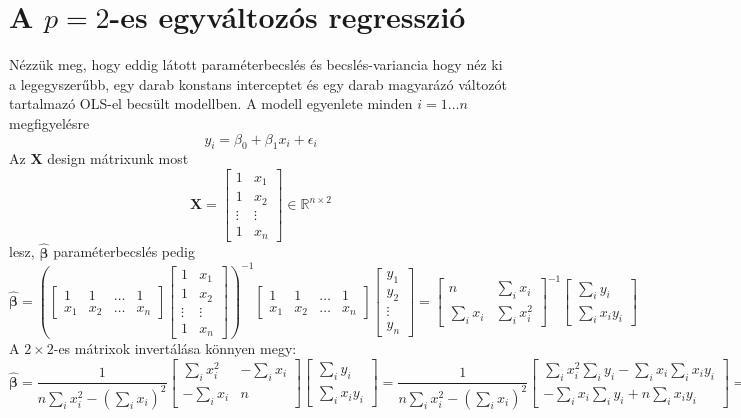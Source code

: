\documentclass[14p]{report}
\def\pmb{\boldsymbol}
\def\ebeta{\hat{\pmb{\beta}}}
\def\e{\epsilon}
\newcounter{x}
\newcounter{y}
\newcounter{z}
\begin{document}
	\section{A $p=2$-es egyváltozós regresszió}
	Nézzük meg, hogy eddig látott paraméterbecslés és becslés-variancia hogy néz ki a legegyszerűbb, egy darab konstans interceptet és egy darab magyarázó változót tartalmazó OLS-el becsült modellben. A modell egyenlete minden $i = 1 \dots n$ megfigyelésre
	\[
	y_i = \beta_0 + \beta_1 x_i + \e_i
	\]
	Az $\pmb{X}$ design mátrixunk most
	\[
	\pmb{X}=
	\begin{bmatrix}
		1 & x_1 \\
		1 & x_2 \\
		\vdots & \vdots \\
		1 & x_n
	\end{bmatrix} \in \mathbb{R}^{n \times 2}
	\]
	lesz, $\ebeta$ paraméterbecslés pedig
	\[
	\ebeta = 
	\left(\begin{bmatrix}
		1 & 1 & \dots & 1 \\
		x_1 & x_2 & \dots & x_n
	\end{bmatrix}
	\begin{bmatrix}
		1 & x_1 \\
		1 & x_2 \\
		\vdots & \vdots \\
		1 & x_n
	\end{bmatrix}\right)^{-1}
	\begin{bmatrix}
		1 & 1 & \dots & 1 \\
		x_1 & x_2 & \dots & x_n
	\end{bmatrix}
	\begin{bmatrix}
		y_1 \\
		y_2 \\
		\vdots \\
		y_n
	\end{bmatrix}
	=
	\begin{bmatrix}
		n & \sum_i{x_i} \\
		\sum_i{x_i} & \sum_i{x_i^2}
	\end{bmatrix}^{-1}
	\begin{bmatrix}
		\sum_i{y_i} \\
		\sum_i{x_i y_i}
	\end{bmatrix}
	\]
	A $2 \times 2$-es mátrixok invertálása könnyen megy:
	\[
	\ebeta = 
	\frac{1}{n\sum_i{x_i^2} - (\sum_i{x_i})^2}
	\begin{bmatrix}
		\sum_i{x_i^2} & -\sum_i{x_i} \\
		-\sum_i{x_i} & n 
	\end{bmatrix}
	\begin{bmatrix}
		\sum_i{y_i} \\
		\sum_i{x_i y_i}
	\end{bmatrix}
	=
	\frac{1}{n\sum_i{x_i^2} - (\sum_i{x_i})^2}
	\begin{bmatrix}
		\sum_i{x_i^2}\sum_i{y_i} - \sum_i{x_i}\sum_i{x_i y_i} \\
		-\sum_i{x_i}\sum_i{y_i} + n\sum_i{x_i y_i}
	\end{bmatrix}
	=
	\]
\end{document}
